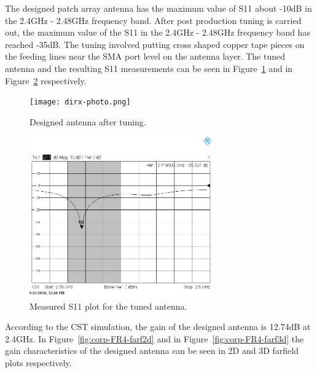 \documentclass[12pt, oneandhalf, chaparabic, sees, ms]{metu}
\begin{document}
\newpage




The designed patch array antenna has the maximum value of S11 about -10dB in the 2.4GHz - 2.48GHz frequency band. 
After post production tuning is carried out, the maximum value of the S11 in the 2.4GHz - 2.48GHz frequency band has reached -35dB.
The tuning involved putting cross shaped copper tape pieces on the feeding lines near the SMA port level on the antenna layer.
The tuned antenna and the resulting S11 measurements can be seen in Figure~\ref{fig:dirx} and in Figure~\ref{fig:dirx-245-s11} respectively.
% 
% 

\begin{figure}[!htbp]
 \begin{center}
  \texttt{[image: dirx-photo.png]}
 \end{center}
 \caption{Designed antenna after tuning.}
  \label{fig:dirx}
\end{figure}


\begin{figure}[!htbp]
 \begin{center}
  \includegraphics[width=0.7\textwidth]{dir-245-s11x2-bw2.png}
 \end{center}
 \caption{Measured S11 plot for the tuned antenna.}
  \label{fig:dirx-245-s11}
\end{figure}



According to the CST simulation, the gain of the designed antenna is 12.74dB at 2.4GHz. 
In Figure~\ref{fig:corp-FR4-farf2d} and in Figure~\ref{fig:corp-FR4-farf3d} the gain characteristics of the designed antenna can be seen in 2D and 3D farfield plots respectively.
\end{document}
